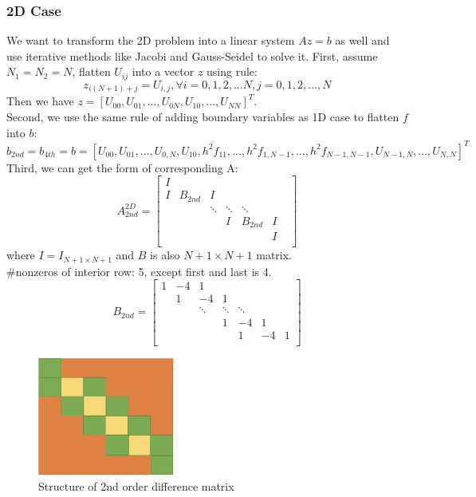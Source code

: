 \documentclass[a4paper]{article}
\begin{document}
\subsubsection{2D Case}
We want to transform the 2D problem into a linear system $Az=b$ as well and use iterative methods like Jacobi and Gauss-Seidel to solve it.
First, assume $N_1=N_2=N$, flatten $U_{ij}$ into a vector $z$ using rule: 
$$z_{i(N+1)+j} = U_{i,j}, \forall i = 0,1,2,...N, j = 0,1,2,...,N$$
Then we have $z = [U_{00}, U_{01},...,U_{0N},U_{10},...,U_{NN}]^T$.  \\
Second, we use the same rule of adding boundary variables as 1D case to flatten $f$ into $b$:
$$b_{2nd} = b_{4th} = b = [U_{00}, U_{01},..., U_{0,N}, U_{10}, h^2f_{11},...,h^2f_{1,N-1},...,h^2f_{N-1,N-1},U_{N-1,N},...,U_{N,N} ]^T $$
Third, we can get the form of corresponding A:
\[
A_{2nd}^{2D}
=
\begin{bmatrix}
    I &  &   &   &  &\\
    I & B_{2nd} & I  &   &  &\\
     & & \ddots & \ddots & \ddots & & \\
     & & & I& B_{2nd}  & I& \\
     & & &  &  & I  \\
\end{bmatrix}
\]
where $I=I_{N+1\times N+1}$ and $B$ is also $N+1 \times N+1$ matrix.\\
\#nonzeros of interior row: 5, except first and last is 4. 
\[
B_{2nd} = 
\begin{bmatrix}
    1 & -4 & 1  &    &   &   &\\
      &  1 & -4 & 1  &   &   &\\
      &     & \ddots & \ddots & \ddots & & \\
     & & & 1& -4  & 1 & \\
     & & &  & 1 & -4  &1\\
\end{bmatrix}
\]

\begin{figure}
\centering
\includegraphics[width=0.4\textwidth]{2nd.png}
\caption{\label{2nd}Structure of 2nd order difference matrix}
\end{figure}
\end{document}
